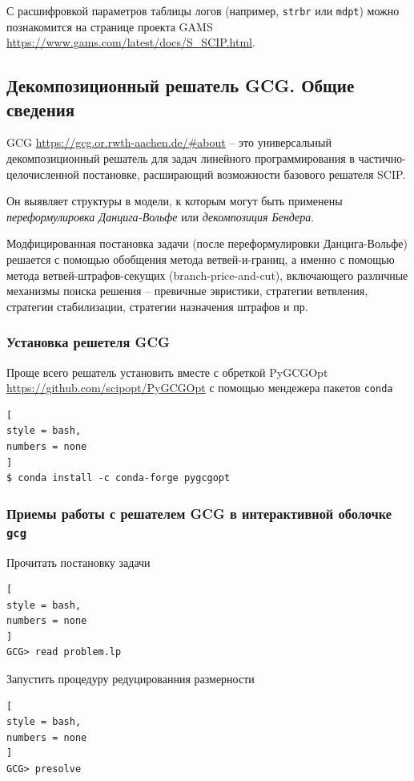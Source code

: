 \documentclass[%
	11pt,
	a4paper,
	utf8,
		]{article}
\begin{document}
С расшифровкой параметров таблицы логов (например, \verb|strbr| или \verb|mdpt|) можно познакомится на странице проекта GAMS \url{https://www.gams.com/latest/docs/S_SCIP.html}.



\subsection{Декомпозиционный решатель GCG. Общие сведения}

GCG \url{https://gcg.or.rwth-aachen.de/#about} -- это универсальный декомпозиционный решатель для задач линейного программирования в частично-целочисленной постановке, расширающий возможности базового решателя SCIP.

Он выявляет структуры в модели, к которым могут быть применены \emph{переформулировка Данцига-Вольфе} или \emph{декомпозиция Бендера}.

Модфицированная постановка задачи (после переформулировки Данцига-Вольфе) решается с помощью обобщения метода ветвей-и-границ, а именно с помощью метода ветвей-штрафов-секущих (branch-price-and-cut), включающего различные механизмы поиска решения -- превичные эвристики, стратегии ветвления, стратегии стабилизации, стратегии назначения штрафов и пр.

\subsubsection{Установка решетеля GCG}

Проще всего решатель установить вместе с обреткой PyGCGOpt \url{https://github.com/scipopt/PyGCGOpt} с помощью мендежера пакетов \texttt{conda}
\begin{lstlisting}[
style = bash,
numbers = none
]
$ conda install -c conda-forge pygcgopt
\end{lstlisting}



\subsubsection{Приемы работы с решателем GCG в интерактивной оболочке \texttt{gcg}}

Прочитать постановку задачи
\begin{lstlisting}[
style = bash,
numbers = none
]
GCG> read problem.lp
\end{lstlisting}

Запустить процедуру редуцированния размерности
\begin{lstlisting}[
style = bash,
numbers = none
]
GCG> presolve
\end{lstlisting}
\end{document}
